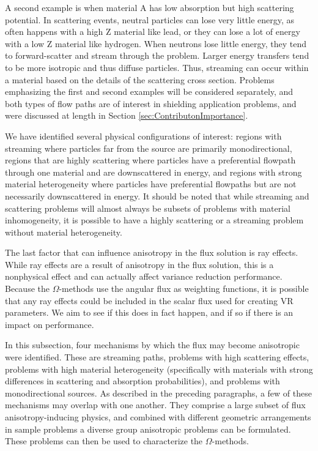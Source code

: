 A second example is when material A has low absorption but high scattering potential. In
scattering events, neutral particles can lose very little energy, as often happens with a high Z
material like lead, or they can lose a lot of energy with a low Z material like hydrogen.
When neutrons lose little energy, they tend to forward-scatter and stream through the problem. 
Larger energy transfers tend to be more isotropic and thus diffuse particles.
Thus, streaming can occur within a material based on the details of the scattering cross section.
Problems emphasizing the first and second examples will be considered separately, and both types of flow paths are of interest in shielding application
problems, and were discussed at length in Section
\ref{sec:ContributonImportance}. 

We have identified several
 physical configurations of interest: regions with streaming where particles
far from the source are primarily monodirectional, regions
that are highly scattering where particles have a preferential flowpath through
one material and are downscattered in energy, and regions with strong
material heterogeneity where particles have preferential flowpaths but are not
necessarily downscattered in energy. It should be noted that while streaming and
scattering problems will almost always be subsets of problems with material
inhomogeneity, it is possible to have a highly scattering or a streaming problem
without material heterogeneity.

The last factor that can influence anisotropy in the flux solution is ray
effects. While ray effects are a result of anisotropy in the flux solution, this
is a nonphysical effect and can actually affect variance reduction
performance. Because the $\Omega$-methods use the angular flux as weighting
functions, it is possible that any ray effects could be included in the scalar flux 
used for creating VR parameters.
We aim to see if this does in fact happen, and if so if there is an impact on performance. 

In this subsection, four mechanisms by which the flux may
become anisotropic were identified. These are streaming paths, problems with high
scattering effects, problems with high material heterogeneity (specifically with
materials with strong differences in scattering and absorption probabilities),
and problems with monodirectional sources. As described in the preceding
paragraphs, a few of these mechanisms may overlap
with one another. They comprise a large subset of flux
anisotropy-inducing physics, and combined with different geometric arrangements
in sample problems a diverse group anisotropic problems can be formulated. These
problems can then be used to characterize the $\Omega$-methods.

